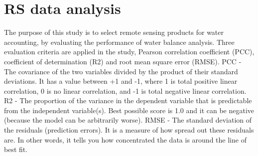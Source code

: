 \documentclass[oneside,openany]{article}%
\begin{document}
\section{RS data analysis}%
\label{sec:RSdataanalysis}%
The purpose of this study is to select remote sensing products for water accounting, by evaluating the performance of water balance analysis. Three evaluation criteria are applied in the study, Pearson correlation coefficient (PCC), coefficient of determination (R2) and root mean square error (RMSE).%
\linebreak%
PCC - The covariance of the two variables divided by the product of their standard deviations. It has a value between +1 and -1, where 1 is total positive linear correlation, 0 is no linear correlation, and -1 is total negative linear correlation.%
\linebreak%
R2 - The proportion of the variance in the dependent variable that is predictable from the independent variable(s). Best possible score is 1.0 and it can be negative (because the model can be arbitrarily worse).%
\linebreak%
RMSE - The standard deviation of the residuals (prediction errors). It is a measure of how spread out these residuals are. In other words, it tells you how concentrated the data is around the line of best fit.%
\linebreak%
\end{document}
